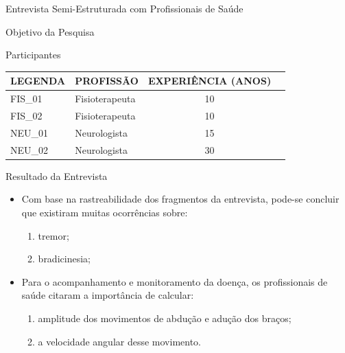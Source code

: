 \documentclass{beamer}
\begin{document}
\begin{frame}{Entrevista Semi-Estruturada com Profissionais de Saúde} 
    \begin{block}{Objetivo da Pesquisa}
    \end{block}
		\begin{block}{Participantes}
			\begin{table}[h]
			\begin{tabular}{|l|l|c|c|}
			\hline
			\textbf{LEGENDA} & \textbf{PROFISSÃO}             & \multicolumn{1}{|l|}{\textbf{EXPERIÊNCIA (ANOS)}} \\ \hline
			FIS\_01          & Fisioterapeuta & 10                                                \\ \hline
			FIS\_02          & Fisioterapeuta    & 10                                                \\ \hline
			NEU\_01          & Neurologista            & 15                                                \\ \hline
			NEU\_02          & Neurologista            & 30                                                \\ \hline
			\end{tabular}
			\end{table}
    \end{block}
\end{frame} 

\begin{frame}{Resultado da Entrevista} 
    \begin{block}{}
			\begin{itemize}[<+->]
				\item Com base na rastreabilidade dos fragmentos da entrevista, pode-se concluir que existiram muitas ocorrências sobre: 
					\begin{enumerate}
						\item tremor;
						\item bradicinesia;
					\end{enumerate}
				\item Para o acompanhamento e monitoramento da doença, os profissionais de saúde citaram a importância de calcular:
					\begin{enumerate}
						\item amplitude dos movimentos de abdução e adução dos braços;
						\item a velocidade angular desse movimento.
					\end{enumerate}
			\end{itemize}
    \end{block}
\end{frame} 
\end{document}
